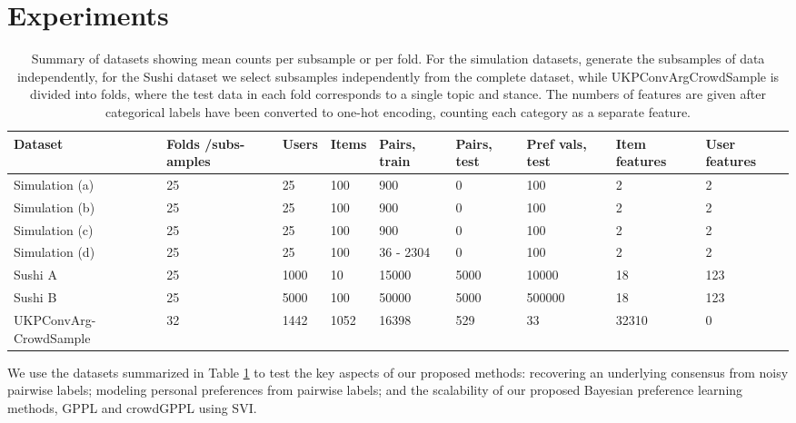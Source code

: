 \section{Experiments}\label{sec:expts}


\begin{table}
\begin{tabularx}{\textwidth}{| p{1.9cm} | X | X | X | X | X | X | X | X |}
\hline
Dataset & Folds /subs-amples & Users & Items & Pairs, train & Pairs, test & Pref vals, test & Item features & User features \\
\hline\hline
Simulation (a) & 25 & 25 & 100 & 900 & 0  & 100 & 2 & 2\\
Simulation (b) & 25 & 25 & 100 & 900 & 0 & 100 & 2 & 2 \\
Simulation (c) & 25 & 25 & 100 & 900 & 0 & 100 & 2 & 2\\
Simulation (d) & 25 & 25 & 100 & 36 - 2304 & 0 & 100 & 2 & 2\\
\hline
Sushi A & 25 & 1000 & 10 & 15000 & 5000 & 10000 & 18 & 123 \\
Sushi B & 25 & 5000 & 100 & 50000 & 5000 & 500000 &  18 & 123 \\
\hline
UKPConvArg-CrowdSample & 32 & 1442 & 1052 & 16398 & 529 & 33 & 32310 & 0
\\ \hline
\end{tabularx}
\caption{Summary of datasets showing mean counts per subsample or per fold. For the simulation datasets, generate the subsamples of data independently, for the Sushi dataset we select subsamples independently from the complete dataset, while  
UKPConvArgCrowdSample is divided into folds, where the test data in each fold corresponds to a single topic and stance. The numbers of features are given after categorical labels have been converted to one-hot encoding, counting
each category as a separate feature.
}
\label{tab:datasets}
\end{table}
We use the datasets summarized in Table \ref{tab:datasets} to test the key aspects of our proposed methods: recovering an underlying consensus from noisy pairwise labels; modeling personal preferences from pairwise labels; and the scalability of our proposed Bayesian preference learning methods, GPPL and crowdGPPL using SVI.

